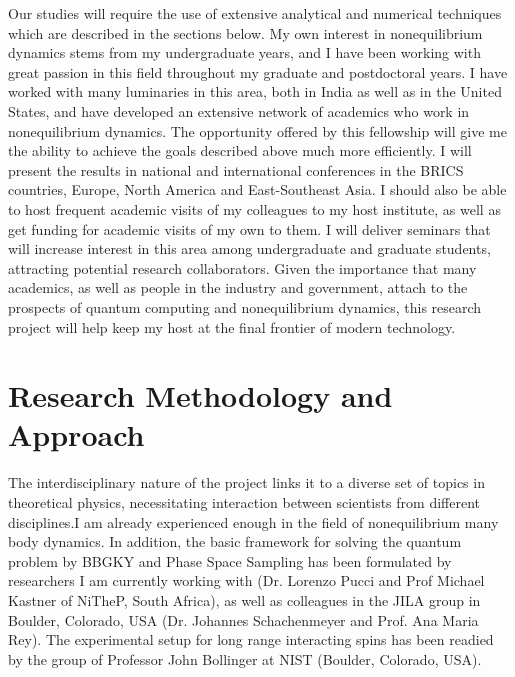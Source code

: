 \documentclass[a4paper,11pt,color]{article}
\begin{document}
Our studies will require the use of extensive analytical and numerical techniques which are described in the sections below. My own interest in nonequilibrium dynamics stems from my undergraduate years, and I have been working with great passion in this field throughout my graduate and postdoctoral years. I have worked with many luminaries in this area, both in India as well as in the United States, and have developed an extensive network of academics who work in nonequilibrium dynamics. The opportunity offered by this fellowship will give me the ability to achieve the goals described above much more efficiently. I will present the results in national and international conferences in the BRICS countries, Europe, North America and East-Southeast Asia. I should also be able to host frequent academic visits of my colleagues to my host institute, as well as get funding for academic visits of my own to them. I will deliver seminars that will increase interest in this area among undergraduate and graduate students, attracting potential research collaborators.  Given the importance that many academics, as well as people in the industry and government, attach to the prospects of quantum computing and nonequilibrium dynamics, this research project will help keep my host at the final frontier of modern technology.
 
\section{Research Methodology and Approach}
\label{sec:research_methodology}

The interdisciplinary nature of the project links it to  a diverse set of topics in theoretical physics, necessitating interaction between scientists from different disciplines.I am already experienced enough in the field of nonequilibrium many body dynamics. In addition, the basic framework for solving the quantum problem by BBGKY and Phase Space Sampling has been formulated by researchers I am currently working with (Dr. Lorenzo Pucci and Prof Michael Kastner of NiTheP, South Africa), as well as colleagues in the JILA group in Boulder, Colorado, USA (Dr. Johannes Schachenmeyer and Prof. Ana Maria Rey). The experimental setup for long range interacting spins has been readied by the group of Professor John Bollinger at NIST (Boulder, Colorado, USA).
\end{document}
